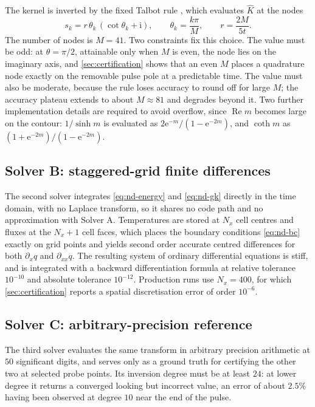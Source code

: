 \documentclass[preprint,12pt,a4paper]{elsarticle}
\theoremstyle{plain}
\theoremstyle{definition}
\theoremstyle{remark}
\begin{document}
The kernel is inverted by the fixed Talbot rule \cite{Talbot1979,Dingfelder2014}, which evaluates $\hat{K}$ at
the nodes
%
\begin{equation}
  s_{k} = r\,\theta_{k}\,\left(\cot\theta_{k} + \mathrm{i}\right),
  \qquad
  \theta_{k} = \frac{k\pi}{M},
  \qquad
  r = \frac{2M}{5t} .
  \label{eq:talbot-nodes}
\end{equation}
%
The number of nodes is $M = 41$. Two constraints fix this choice. The value
must be odd: at $\theta = \pi/2$, attainable only when $M$ is even, the node
lies on the imaginary axis, and \cref{sec:certification} shows that an even $M$
places a quadrature node exactly on the removable pulse pole at a predictable
time. The value must also be moderate, because the rule loses accuracy to
round off for large $M$; the accuracy plateau extends to about $M \approx 81$
and degrades beyond it. Two further implementation details are required to
avoid overflow, since $\operatorname{Re} m$ becomes large on the contour:
$1/\sinh m$ is evaluated as $2\mathrm{e}^{-m}/(1-\mathrm{e}^{-2m})$, and
$\coth m$ as $(1+\mathrm{e}^{-2m})/(1-\mathrm{e}^{-2m})$.

\subsection{Solver B: staggered-grid finite differences}
\label{sec:methods-fd}

The second solver integrates \eqref{eq:nd-energy} and \eqref{eq:nd-gk} directly
in the time domain, with no Laplace transform, so it shares no code path and no
approximation with Solver A. Temperatures are stored at $N_{x}$ cell centres
and fluxes at the $N_{x}+1$ cell faces, which places the boundary conditions
\eqref{eq:nd-bc} exactly on grid points and yields second order accurate
centred differences for both $\partial_{x} q$ and $\partial_{xx} q$. The
resulting system of ordinary differential equations is stiff, and is integrated
with a backward differentiation formula at relative tolerance $10^{-10}$ and
absolute tolerance $10^{-12}$. Production runs use $N_{x} = 400$, for which
\cref{sec:certification} reports a spatial discretisation error of order
$10^{-6}$.

\subsection{Solver C: arbitrary-precision reference}
\label{sec:methods-mp}

The third solver evaluates the same transform in arbitrary precision arithmetic
at $50$ significant digits, and serves only as a ground truth for certifying
the other two at selected probe points. Its inversion degree must be at least
$24$: at lower degree it returns a converged looking but incorrect value, an
error of about $2.5\%$ having been observed at degree $10$ near the end of the
pulse.
\end{document}
